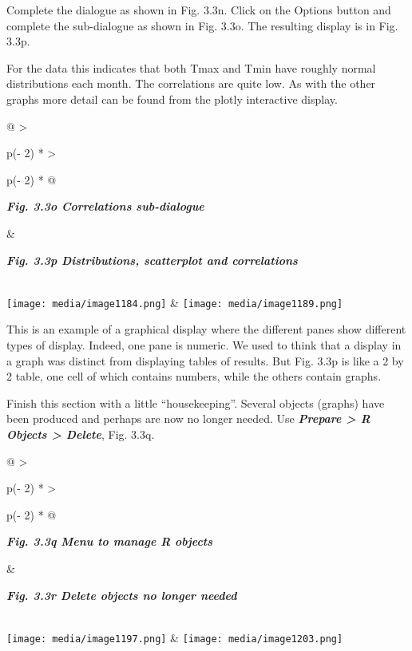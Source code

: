 \documentclass[
  letterpaper,
  DIV=11,
  numbers=noendperiod]{scrreprt}
\begin{document}
Complete the dialogue as shown in Fig. 3.3n. Click on the Options button
and complete the sub-dialogue as shown in Fig. 3.3o. The resulting
display is in Fig. 3.3p.

For the data this indicates that both Tmax and Tmin have roughly normal
distributions each month. The correlations are quite low. As with the
other graphs more detail can be found from the plotly interactive
display.

\begin{longtable}[]{@{}
  >{\raggedright\arraybackslash}p{(\columnwidth - 2\tabcolsep) * }
  >{\raggedright\arraybackslash}p{(\columnwidth - 2\tabcolsep) * }@{}}
\toprule\noalign{}
\begin{minipage}[b]{\linewidth}\raggedright
\textbf{\emph{Fig. 3.3o Correlations sub-dialogue}}
\end{minipage} & \begin{minipage}[b]{\linewidth}\raggedright
\textbf{\emph{Fig. 3.3p Distributions, scatterplot and correlations}}
\end{minipage} \\
\midrule\noalign{}
\endhead
\bottomrule\noalign{}
\endlastfoot
\texttt{[image: media/image1184.png]}
&
\texttt{[image: media/image1189.png]} \\
\end{longtable}

This is an example of a graphical display where the different panes show
different types of display. Indeed, one pane is numeric. We used to
think that a display in a graph was distinct from displaying tables of
results. But Fig. 3.3p is like a 2 by 2 table, one cell of which
contains numbers, while the others contain graphs.

Finish this section with a little ``housekeeping''. Several objects
(graphs) have been produced and perhaps are now no longer needed. Use
\textbf{\emph{Prepare \textgreater{} R Objects \textgreater{} Delete}},
Fig. 3.3q.

\begin{longtable}[]{@{}
  >{\raggedright\arraybackslash}p{(\columnwidth - 2\tabcolsep) * }
  >{\raggedright\arraybackslash}p{(\columnwidth - 2\tabcolsep) * }@{}}
\toprule\noalign{}
\begin{minipage}[b]{\linewidth}\raggedright
\textbf{\emph{Fig. 3.3q Menu to manage R objects}}
\end{minipage} & \begin{minipage}[b]{\linewidth}\raggedright
\textbf{\emph{Fig. 3.3r Delete objects no longer needed}}
\end{minipage} \\
\midrule\noalign{}
\endhead
\bottomrule\noalign{}
\endlastfoot
\texttt{[image: media/image1197.png]}
&
\texttt{[image: media/image1203.png]} \\
\end{longtable}
\end{document}

